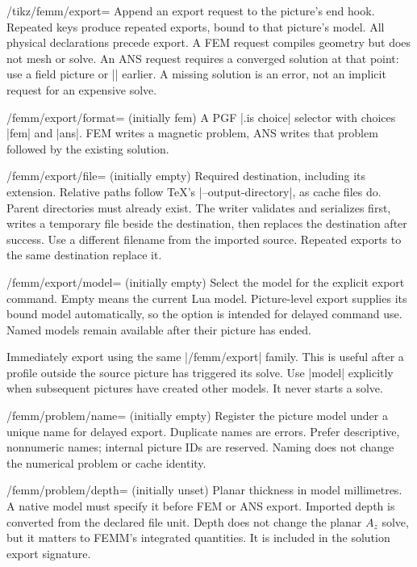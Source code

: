 \begin{key}{/tikz/femm/export=}
Append an export request to the picture's end hook. Repeated keys produce repeated
exports, bound to that picture's model. All physical declarations precede export.
A FEM request compiles geometry but does not mesh or solve. An ANS request requires
a converged solution at that point: use a field picture or |\femmsolve| earlier.
A missing solution is an error, not an implicit request for an expensive solve.
\end{key}
\begin{key}{/femm/export/format= (initially fem)}
A PGF |.is choice| selector with choices |fem| and |ans|. FEM writes a magnetic
problem, ANS writes that problem followed by the existing solution.
\end{key}
\begin{key}{/femm/export/file= (initially empty)}
Required destination, including its extension. Relative paths follow TeX's
|--output-directory|, as cache files do. Parent directories must already exist.
The writer validates and serializes first, writes a temporary file beside the
destination, then replaces the destination after success. Use a different filename
from the imported source. Repeated exports to the same destination replace it.
\end{key}
\begin{key}{/femm/export/model= (initially empty)}
Select the model for the explicit export command. Empty means the current Lua
model. Picture-level export supplies its bound model automatically, so the option
is intended for delayed command use. Named models remain available after their
picture has ended.
\end{key}
\begin{command}{\femmexport{}}
Immediately export using the same |/femm/export| family. This is useful after a
profile outside the source picture has triggered its solve. Use |model| explicitly
when subsequent pictures have created other models. It never starts a solve.
\end{command}
\begin{key}{/femm/problem/name= (initially empty)}
Register the picture model under a unique name for delayed export. Duplicate
names are errors. Prefer descriptive, nonnumeric names; internal picture IDs
are reserved. Naming does not change the numerical problem or cache identity.
\end{key}
\begin{key}{/femm/problem/depth= (initially unset)}
Planar thickness in model millimetres. A native model must specify it before
FEM or ANS export. Imported depth is converted from the declared file unit.
Depth does not change the planar $A_z$ solve, but it matters to FEMM's integrated
quantities. It is included in the solution export signature.
\end{key}
